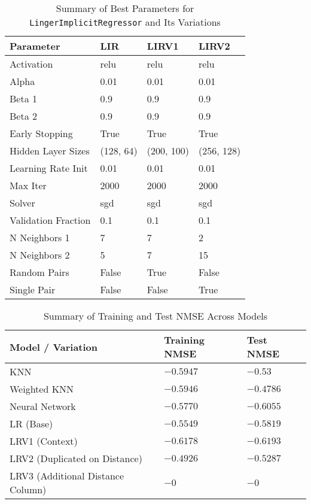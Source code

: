 \documentclass[a4paper, 12pt]{report}
\begin{document}
\begin{table}[H]
    \centering
    \caption{Summary of Best Parameters for \texttt{LingerImplicitRegressor} and Its Variations}
    \label{tab:best_parameters_LingerImageRegressor_variations_exp6}
    \begin{tabular}{|l|l|l|l|}
    \hline
    Parameter & LIR & LIRV1 & LIRV2 \\
    \hline
    Activation & relu & relu & relu \\
    Alpha & 0.01 & 0.01 & 0.01 \\
    Beta 1 & 0.9 & 0.9 & 0.9 \\
    Beta 2 & 0.9 & 0.9 & 0.9 \\
    Early Stopping & True & True & True \\
    Hidden Layer Sizes & (128, 64) & (200, 100) & (256, 128) \\
    Learning Rate Init & 0.01 & 0.01 & 0.01 \\
    Max Iter & 2000 & 2000 & 2000 \\
    Solver & sgd & sgd & sgd \\
    Validation Fraction & 0.1 & 0.1 & 0.1 \\
    N Neighbors 1 & 7 & 7 & 2 \\
    N Neighbors 2 & 5 & 7 & 15 \\
    Random Pairs & False & True & False \\
    Single Pair & False & False & True \\
    \hline
    \end{tabular}
\end{table}

\begin{table}[H]
    \centering
    \caption{Summary of Training and Test NMSE Across Models}
    \label{tab:summary_nmse_all_models_MNSE_exp6}
    \small
    \begin{tabular}{|l|l|l|}
    \toprule
    \textbf{Model / Variation} & \textbf{Training NMSE} & \textbf{Test NMSE} \\
    \midrule
    KNN & $-0.5947$ & $-0.53$ \\
    Weighted KNN & $-0.5946$ & $\mathbf{-0.4786}$ \\
    Neural Network & $-0.5770$ & $-0.6055$ \\
    LR (Base) & $-0.5549$ & $-0.5819$ \\
    LRV1 (Context) & $ -0.6178$ & $-0.6193$ \\
    LRV2 (Duplicated on Distance) & $-0.4926$ & $-0.5287$ \\
    LRV3 (Additional Distance Column) & $-0$ & $-0$ \\
    \bottomrule
    \end{tabular}
\end{table}
\end{document}
